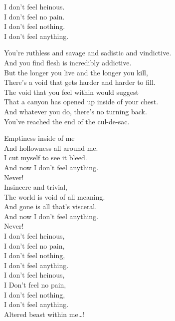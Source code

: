 I don't feel heinous. \\
I don't feel no pain. \\
I don't feel nothing. \\
I don't feel anything. \\


You're ruthless and savage and sadistic and vindictive. \\
And you find  flesh is incredibly addictive. \\

But the longer you live and the longer you kill, \\
There's a void that gets harder and harder to fill. \\

The void that you feel within would suggest \\
That a canyon has opened up inside of your chest. \\

And whatever you do, there's no turning back. \\
You've reached the end of the cul-de-sac. \\


Emptiness inside of me \\
And hollowness all around me. \\
I cut myself to see it bleed. \\
And now I don't feel anything. \\
Never! \\

Insincere and trivial, \\
The world is void of all meaning. \\
And gone is all that's visceral. \\
And now I don't feel anything. \\
Never! \\

I don't feel heinous, \\
I don't feel no pain, \\
I don't feel nothing, \\
I don't feel anything. \\
I don't feel heinous, \\
I Don't feel no pain, \\
I don't feel nothing, \\
I don't feel anything. \\
Altered beast within me…! \\

